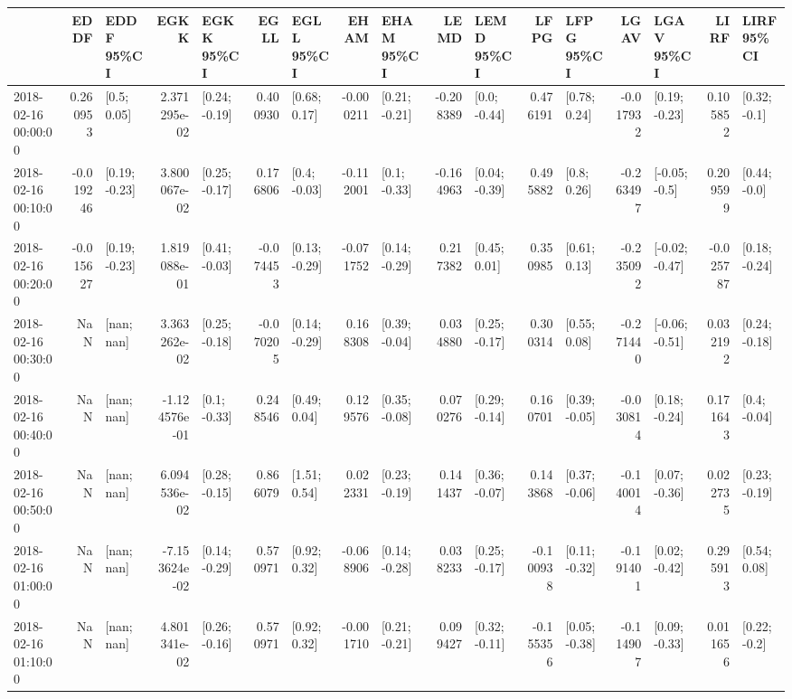 \begin{tabular}{lrlrlrlrlrlrlrlrl}
\toprule
{} &      EDDF &      EDDF 95\%CI &          EGKK &      EGKK 95\%CI &      EGLL &      EGLL 95\%CI &      EHAM &      EHAM 95\%CI &      LEMD &      LEMD 95\%CI &      LFPG &      LFPG 95\%CI &      LGAV &      LGAV 95\%CI &      LIRF &      LIRF 95\%CI \\
\midrule
2018-02-16 00:00:00 &  0.260953 &     [0.5; 0.05] &  2.371295e-02 &   [0.24; -0.19] &  0.400930 &    [0.68; 0.17] & -0.000211 &   [0.21; -0.21] & -0.208389 &    [0.0; -0.44] &  0.476191 &    [0.78; 0.24] & -0.017932 &   [0.19; -0.23] &  0.105852 &    [0.32; -0.1] \\
2018-02-16 00:10:00 & -0.019246 &   [0.19; -0.23] &  3.800067e-02 &   [0.25; -0.17] &  0.176806 &    [0.4; -0.03] & -0.112001 &    [0.1; -0.33] & -0.164963 &   [0.04; -0.39] &  0.495882 &     [0.8; 0.26] & -0.263497 &   [-0.05; -0.5] &  0.209599 &    [0.44; -0.0] \\
2018-02-16 00:20:00 & -0.015627 &   [0.19; -0.23] &  1.819088e-01 &   [0.41; -0.03] & -0.074453 &   [0.13; -0.29] & -0.071752 &   [0.14; -0.29] &  0.217382 &    [0.45; 0.01] &  0.350985 &    [0.61; 0.13] & -0.235092 &  [-0.02; -0.47] & -0.025787 &   [0.18; -0.24] \\
2018-02-16 00:30:00 &       NaN &      [nan; nan] &  3.363262e-02 &   [0.25; -0.18] & -0.070205 &   [0.14; -0.29] &  0.168308 &   [0.39; -0.04] &  0.034880 &   [0.25; -0.17] &  0.300314 &    [0.55; 0.08] & -0.271440 &  [-0.06; -0.51] &  0.032192 &   [0.24; -0.18] \\
2018-02-16 00:40:00 &       NaN &      [nan; nan] & -1.124576e-01 &    [0.1; -0.33] &  0.248546 &    [0.49; 0.04] &  0.129576 &   [0.35; -0.08] &  0.070276 &   [0.29; -0.14] &  0.160701 &   [0.39; -0.05] & -0.030814 &   [0.18; -0.24] &  0.171643 &    [0.4; -0.04] \\
2018-02-16 00:50:00 &       NaN &      [nan; nan] &  6.094536e-02 &   [0.28; -0.15] &  0.866079 &    [1.51; 0.54] &  0.022331 &   [0.23; -0.19] &  0.141437 &   [0.36; -0.07] &  0.143868 &   [0.37; -0.06] & -0.140014 &   [0.07; -0.36] &  0.022735 &   [0.23; -0.19] \\
2018-02-16 01:00:00 &       NaN &      [nan; nan] & -7.153624e-02 &   [0.14; -0.29] &  0.570971 &    [0.92; 0.32] & -0.068906 &   [0.14; -0.28] &  0.038233 &   [0.25; -0.17] & -0.100938 &   [0.11; -0.32] & -0.191401 &   [0.02; -0.42] &  0.295913 &    [0.54; 0.08] \\
2018-02-16 01:10:00 &       NaN &      [nan; nan] &  4.801341e-02 &   [0.26; -0.16] &  0.570971 &    [0.92; 0.32] & -0.001710 &   [0.21; -0.21] &  0.099427 &   [0.32; -0.11] & -0.155356 &   [0.05; -0.38] & -0.114907 &   [0.09; -0.33] &  0.011656 &    [0.22; -0.2] \\

\end{tabular}
